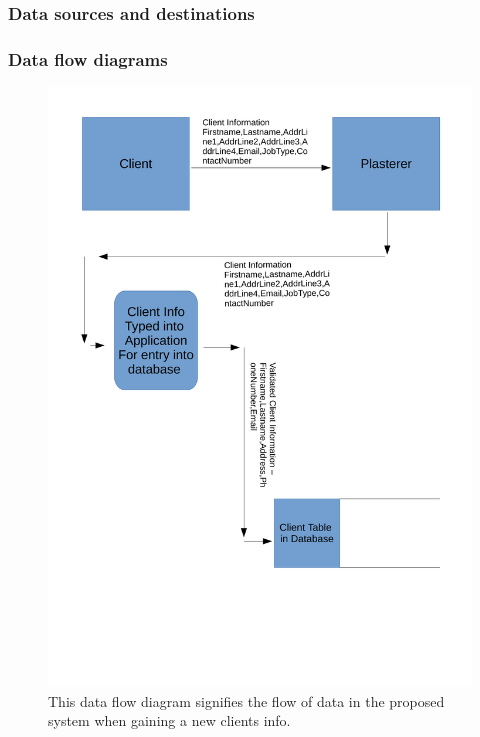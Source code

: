 \subsubsection{Data sources and destinations}



\subsubsection{Data flow diagrams}

\begin{figure}[H]
    \includegraphics[width=\textwidth]{./Analysis/images/proposedSystemGainingClientInfo.pdf}
    \caption{This data flow diagram signifies the flow of data in the proposed system when gaining a new clients info.} \label{fig:proposed_system_dfd_1}
\end{figure}



